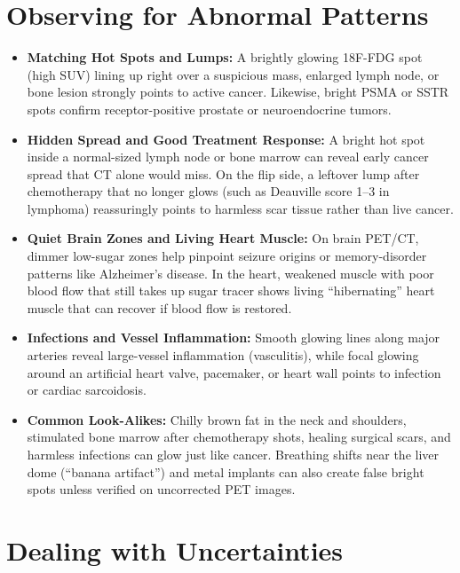\section{Observing for Abnormal Patterns}

\begin{itemize}
    \item \textbf{Matching Hot Spots and Lumps:} A brightly glowing 18F-FDG spot (high SUV) lining up right over a suspicious mass, enlarged lymph node, or bone lesion strongly points to active cancer. Likewise, bright PSMA or SSTR spots confirm receptor-positive prostate or neuroendocrine tumors.
    \item \textbf{Hidden Spread and Good Treatment Response:} A bright hot spot inside a normal-sized lymph node or bone marrow can reveal early cancer spread that CT alone would miss. On the flip side, a leftover lump after chemotherapy that no longer glows (such as Deauville score 1--3 in lymphoma) reassuringly points to harmless scar tissue rather than live cancer.
    \item \textbf{Quiet Brain Zones and Living Heart Muscle:} On brain PET/CT, dimmer low-sugar zones help pinpoint seizure origins or memory-disorder patterns like Alzheimer's disease. In the heart, weakened muscle with poor blood flow that still takes up sugar tracer shows living ``hibernating'' heart muscle that can recover if blood flow is restored.
    \item \textbf{Infections and Vessel Inflammation:} Smooth glowing lines along major arteries reveal large-vessel inflammation (vasculitis), while focal glowing around an artificial heart valve, pacemaker, or heart wall points to infection or cardiac sarcoidosis.
    \item \textbf{Common Look-Alikes:} Chilly brown fat in the neck and shoulders, stimulated bone marrow after chemotherapy shots, healing surgical scars, and harmless infections can glow just like cancer. Breathing shifts near the liver dome (``banana artifact'') and metal implants can also create false bright spots unless verified on uncorrected PET images.
\end{itemize}

\section{Dealing with Uncertainties}

